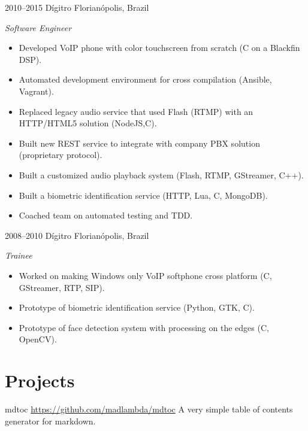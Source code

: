 \documentclass[]{friggeri-cv} %
\begin{document}
\begin{entrylist}
\entry
{2010--2015}
{Dígitro}
{Florianópolis, Brazil}
{\emph{Software Engineer} \\

\begin{itemize}
  \item Developed VoIP phone with color touchscreen from scratch (C on a Blackfin DSP).
  \item Automated development environment for cross compilation (Ansible, Vagrant).
  \item Replaced legacy audio service that used Flash (RTMP) with an HTTP/HTML5 solution (NodeJS,C).
  \item Built new REST service to integrate with company PBX solution (proprietary protocol).
  \item Built a customized audio playback system (Flash, RTMP, GStreamer, C++).
  \item Built a biometric identification service (HTTP, Lua, C, MongoDB).
  \item Coached team on automated testing and TDD.
\end{itemize}
}
\end{entrylist}

\begin{entrylist}
\entry
{2008--2010}
{Dígitro}
{Florianópolis, Brazil}
{\emph{Trainee} \\

\begin{itemize}
  \item Worked on making Windows only VoIP softphone cross platform (C, GStreamer, RTP, SIP).
  \item Prototype of biometric identification service (Python, GTK, C).
  \item Prototype of face detection system with processing on the edges (C, OpenCV).
\end{itemize}

}
\end{entrylist}

\section{Projects}

\begin{entrylist}
\entry
{}
{mdtoc}
{\href{https://github.com/madlambda/mdtoc}{https://github.com/madlambda/mdtoc}}
{
A very simple table of contents generator for markdown.
}
\end{entrylist}
\end{document}
